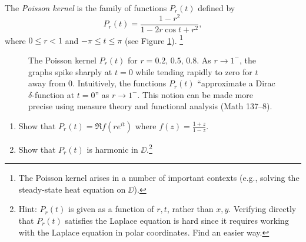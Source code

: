 \documentclass{../math135}
\begin{document}
\begin{exercise}
	The \emph{Poisson kernel} is the family of functions \(P_r(t)\) defined by
	\begin{equation*}
		P_r(t) = \frac{1 - r^2}{1 - 2r \cos t + r^2},
	\end{equation*}
	where \(0 \le r < 1\) and \(-\pi \le t \le \pi\) (see Figure
  \ref{FigurePoisson}).  \footnote{The Poisson kernel arises in a
    number of important contexts (e.g., solving the steady-state heat
    equation on \(\DD\)).}
	  \begin{figure}[h]
	    \begin{center}
	      \caption{\footnotesize The Poisson kernel \(P_r(t)\) for
          \(r = 0.2, \,0.5, \,0.8\).  As \(r\to 1^-\), the graphs
          spike sharply at \(t = 0\) while tending rapidly to zero for
          \(t\) away from \(0\).  Intuitively, the functions
          \(P_r(t)\) ``approximate a Dirac \(\delta\)-function at
          \(t = 0\)'' as \(r \to 1^-\).  This notion can be made more
          precise using measure theory and functional analysis (Math
          137--8).}
	      \label{FigurePoisson}
	    \end{center}
	  \end{figure}

	\begin{enumerate}
  \item Show that \(P_r(t) = \Re f(re^{it})\) where
    \(f(z) = \frac{1+z}{1-z}\).

  \item Show that \(P_r(t)\) is harmonic in \(\DD\).\footnote{Hint:
      \(P_r(t)\) is given as a function of \(r,t\), rather than
      \(x,y\).  Verifying directly that \(P_r(t)\) satisfies the
      Laplace equation is hard since it requires working with the
      Laplace equation in polar coordinates.  Find an easier way.}
	\end{enumerate}
\end{exercise}
\end{document}
